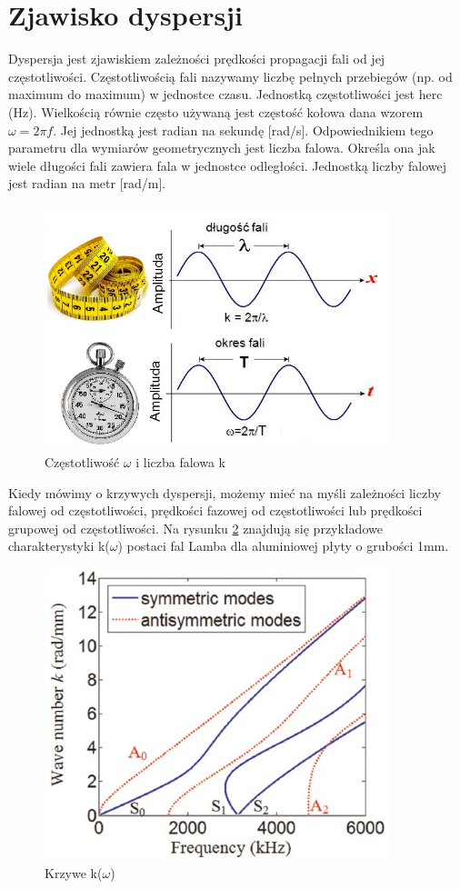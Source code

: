 
\section{Zjawisko dyspersji}
\label{sec:rodzaje_fal_sprezystych}

Dyspersja jest zjawiskiem zależności prędkości propagacji fali od jej częstotliwości. Częstotliwością fali nazywamy liczbę pełnych przebiegów (np. od maximum do maximum) w jednostce czasu. Jednostką częstotliwości jest herc (Hz). Wielkością równie często używaną jest częstość kołowa dana wzorem \( \omega = 2\pi f \). Jej jednostką jest radian na sekundę [rad/s]. Odpowiednikiem tego parametru dla wymiarów geometrycznych jest liczba falowa. Określa ona jak wiele długości fali zawiera fala w jednostce odległości. Jednostką liczby falowej jest radian na metr [rad/m].

\begin{figure}[h]
\centering
\includegraphics[width=10cm]{Zdjecia/2/czestotliwosc1}
\caption{Częstotliwość \( \omega \) i liczba falowa k}
\label{fig:czestotliwosc_i_liczba_falowa}
\end{figure}


Kiedy mówimy o krzywych dyspersji, możemy mieć na myśli zależności liczby falowej od częstotliwości, prędkości fazowej od częstotliwości lub prędkości grupowej od częstotliwości. Na rysunku \ref{fig:krzywe_k_od_omega} znajdują się przykładowe charakterystyki k(\(\omega\)) postaci fal Lamba dla aluminiowej płyty o grubości 1mm.

\begin{figure}[h]
\centering
\includegraphics[width=10cm]{Zdjecia/2/char_fazowa}
\caption{Krzywe k(\(\omega\))}
\label{fig:krzywe_k_od_omega}
\end{figure}

